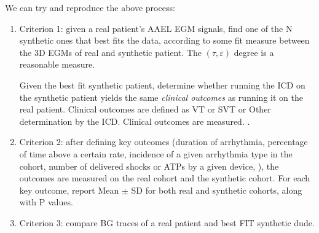 We can try and reproduce the above process:
\begin{enumerate}
	\item Criterion 1: given a real patient's AAEL EGM signals, find one of the N synthetic ones that best fits the data, according to some fit measure between the 3D EGMs of real and synthetic patient.
	The $(\tau,\varepsilon)$ degree is a reasonable measure.
	
	Given the best fit synthetic patient, determine whether running the ICD on the synthetic patient yields the same \emph{clinical outcomes} as running it on the real patient. 
	Clinical outcomes are defined as VT or SVT or Other determination by the ICD.
	Clinical outcomes are measured. .
	
	\item Criterion 2: after defining key outcomes (duration of arrhythmia, percentage of time above a certain rate, incidence of a given arrhythmia type in the cohort, number of delivered shocks or ATPs by a given device, ), the outcomes are measured on the real cohort and the synthetic cohort.
	For each key outcome, report Mean $\pm$ SD for both real and synthetic cohorts, along with P values.
	
	\item Criterion 3: compare BG traces of a real patient and best FIT synthetic dude.
\end{enumerate}